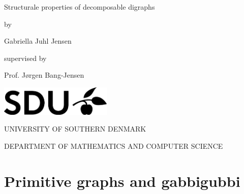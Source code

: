 \documentclass[11pt,oneside,a4paper]{report}
\begin{document}
\begin{titlepage}
	\begin{center}
		\vspace*{1cm}
		\huge{Structurale properties of decomposable digraphs}
		
		\vspace*{0.5cm}
		\large{by}
		
		\vspace{0.5cm}
		\Large{Gabriella Juhl Jensen}
		
		\vspace*{0.5cm}
		\normalsize{supervised by}
		
		\vspace{0.5cm}
		\large{Prof. Jørgen Bang-Jensen}
		
		\vfill
		
		\vspace*{0.7cm}
		\includegraphics[width=0.4\textwidth]{sdulogo}
		
		\vspace*{1cm}
		\MakeUppercase{University of southern Denmark}
		
		\vspace*{0.3cm}
		\MakeUppercase{Department of mathematics and computer science}
		
		\vspace*{0.3cm}
		\large{}
	\end{center}
\end{titlepage}
\tableofcontents
	\part{Primitive graphs and gabbigubbi}
	
\end{document}
